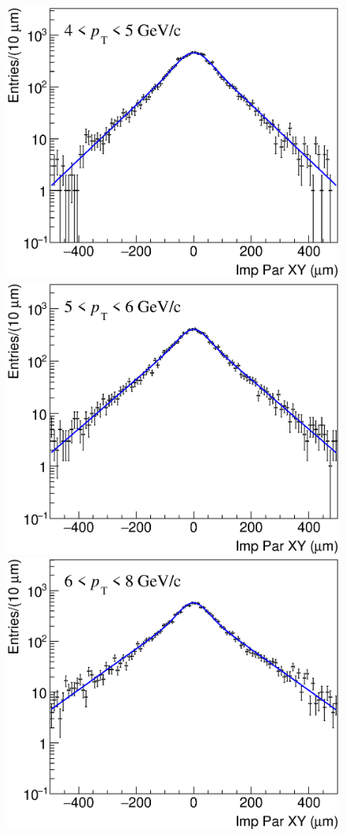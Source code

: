 \documentclass[b5paper,10pt,twoside,oldstyle,classica]{toptesi}
\begin{document}
\begin{figure}[h]
\begin{center}
{\includegraphics[scale = 0.24]{ImpParRecoFD_4-5.eps}}
\hspace{0cm}
{\includegraphics[scale = 0.24]{ImpParRecoFD_5-6.eps}}
\vspace{0cm}
{\includegraphics[scale = 0.24]{ImpParRecoFD_6-8.eps}}

\end{center}
\end{figure}
\end{document}
